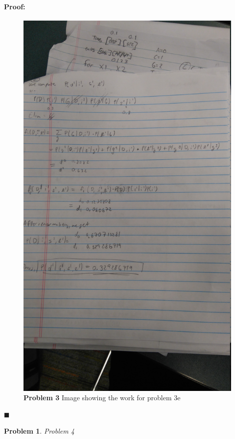 \documentclass[12pt]{article}
\newenvironment{proof}{\paragraph{Proof: }}{\hfill$\blacksquare$}
\newtheorem{problem}{Problem}%
\begin{document}
\begin{proof}
\begin{figure}[!htbp]
\centering
\includegraphics[width = 13cm]{hw6_3e.jpg}
\caption{\textbf{Problem 3} Image showing the work for problem 3e}
\end{figure}

\end{proof}


\newpage

\begin{problem}
\normalfont 
Problem 4
\end{problem}
\end{document}
